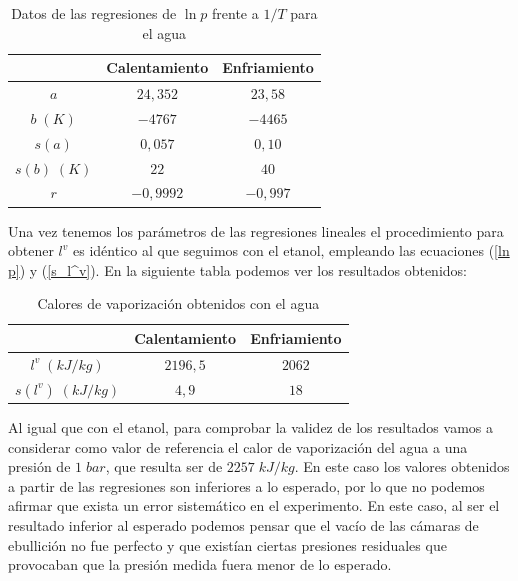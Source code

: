\documentclass[a4paper,12pt,titlepage]{article}
\begin{document}
\begin{table}[h!]
\centering
\begin{tabular}{c|c|c|}
\cline{2-3}
    & Calentamiento & Enfriamiento \\ \hline
\multicolumn{1}{|c|}{$a$}         & $24,352$ & $23,58$ \\ \hline
\multicolumn{1}{|c|}{$b\;(K)$}    & $-4767$ & $-4465$ \\ \hline
\multicolumn{1}{|c|}{$s(a)$}      & $0,057$ & $0,10$ \\ \hline
\multicolumn{1}{|c|}{$s(b)\;(K)$} & $22$ & $40$ \\ \hline
\multicolumn{1}{|c|}{$r$}         & $-0,9992$ & $-0,997$ \\ \hline
\end{tabular}
\caption{Datos de las regresiones de $\ln p$ frente a $1/T$ para el agua}
\label{tab:my-table}
\end{table}

Una vez tenemos los parámetros de las regresiones lineales el procedimiento para obtener $l^v$ es idéntico al que seguimos con el etanol, empleando las ecuaciones (\ref{ln p}) y (\ref{s_l^v}). En la siguiente tabla podemos ver los resultados obtenidos:

\begin{table}[h!]
\centering
\begin{tabular}{c|c|c|}
\cline{2-3}
                                       & Calentamiento & Enfriamiento \\ \hline
\multicolumn{1}{|c|}{$l^v\;(kJ/kg)$}    & $2196,5$ & $2062$ \\ \hline
\multicolumn{1}{|c|}{$s(l^v)\;(kJ/kg)$} & $4,9$ & $18$ \\ \hline
\end{tabular}
\caption{Calores de vaporización obtenidos con el agua}
\label{tab:my-table}
\end{table}

Al igual que con el etanol, para comprobar la validez de los resultados vamos a considerar como valor de referencia el calor de vaporización del agua a una presión de $1\;bar$, que resulta ser de $2257\;kJ/kg$. En este caso los valores obtenidos a partir de las regresiones son inferiores a lo esperado, por lo que no podemos afirmar que exista un error sistemático en el experimento. En este caso, al ser el resultado inferior al esperado podemos pensar que el vacío de las cámaras de ebullición no fue perfecto y que existían ciertas presiones residuales que provocaban que la presión medida fuera menor de lo esperado.
\end{document}
